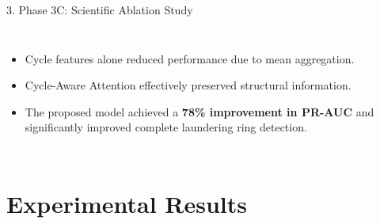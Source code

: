 \documentclass[aspectratio=169,11pt]{beamer}
\begin{document}
\begin{frame}{3. Phase 3C: Scientific Ablation Study}
\begin{columns}[T]
{\vspace{0.06cm}

\begin{itemize}\setlength{\itemsep}{5pt}\setlength{\parskip}{0pt}

\item Cycle features alone reduced performance due to mean aggregation.

\item Cycle-Aware Attention effectively preserved structural information.

\item The proposed model achieved a \textbf{78\% improvement in PR-AUC} and significantly improved complete laundering ring detection.

\end{itemize}
}

\end{columns}

\end{frame}


\section{Experimental Results}
\end{document}
